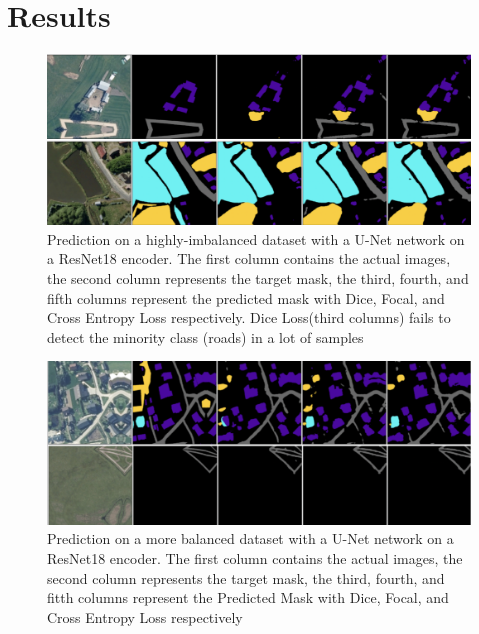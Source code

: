 \documentclass[conference]{IEEEtran}
\begin{document}
\section{Results}
\begin{figure}
    \includegraphics[]{images/no-roads-losses/no-roads-smaller.png}
    \caption{Prediction on a highly-imbalanced dataset with a U-Net network on a ResNet18 encoder. The first column contains the actual images, the second column represents the target mask, the third, fourth, and fifth columns represent the predicted mask with Dice, Focal, and Cross Entropy Loss respectively. Dice Loss(third columns) fails to detect the minority class (roads) in a lot of samples}
\end{figure}

\begin{figure}
    \includegraphics[]{images/roads-losses/roads-smaller.png}
    \caption{Prediction on a more balanced dataset with a U-Net network on a ResNet18 encoder. The first column contains the actual images, the second column represents the target mask, the third, fourth, and fitth columns represent the Predicted Mask with Dice, Focal, and Cross Entropy Loss respectively}
\end{figure}
\end{document}
